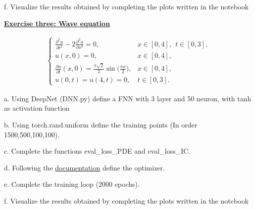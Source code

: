 \documentclass{article}
\newcommand{\step}[1]{\underline{\textbf{\large{#1}}} }
\begin{document}
    f. Visualize the results obtained by completing the plots written in the notebook
    \newpage
    \restoregeometry
  \begin{center}\step{Exercise three: Wave equation}\end{center}
  \begin{center}
    
    \begin{align*}
      \begin{cases}
        \displaystyle \frac{\partial^2 u}{\partial t^2}-2\frac{\partial^2 u}{\partial x^2}=0, & x\in [0,4], \ \ t\in[0,3],\\[10pt]
        \displaystyle u(x,0)= 0, &x\in[0,4], \\[10pt]
        \displaystyle \frac{\partial u}{\partial t}(x,0) =  \frac{\pi \sqrt2}{2}\sin \Big(\frac{\pi x}{2}\Big), &x\in[0,4], \\[10pt]
        \displaystyle u(0,t)=u(4,t)=0, &t\in[0,3].
      \end{cases}
    \end{align*}
  
  \end{center}

    a. Using DeepNet (DNN.py) define a FNN with 3 layer and 50 neuron, with tanh as activation function
    
    b. Using torch.rand.uniform define the training points (In order 1500,500,100,100).

    c. Complete the functions eval\_loss\_PDE and eval\_loss\_IC.

    d. Following the \href{https://pytorch.org/docs/stable/generated/torch.optim.Adam.html}{documentation} define the optimizer.

    e. Complete the training loop (2000 epochs).

    f. Visualize the results obtained by completing the plots written in the notebook
\end{document}
